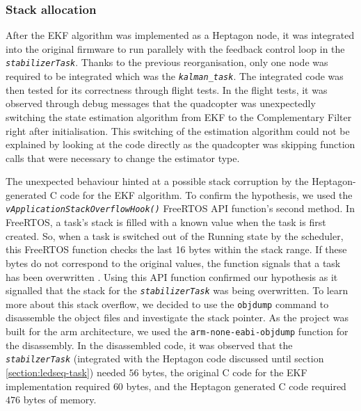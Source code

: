\documentclass[10pt, a4paper]{article}
\newcommand{\textFunc}[1]{\texttt{\textit{#1}}}
\newcommand{\code}[1]{\texttt{#1}}
\begin{document}
    \subsubsection{Stack allocation}
    After the EKF algorithm was implemented as a Heptagon node, it was integrated into the original firmware to run parallely with the feedback control loop in the \textFunc{stabilizerTask}. Thanks to the previous reorganisation, only one node was required to be integrated which was the \textFunc{kalman\_task}. The integrated code was then tested for its correctness through flight tests. In the flight tests, it was observed through debug messages that the quadcopter was unexpectedly switching the state estimation algorithm from EKF to the Complementary Filter right after initialisation. This switching of the estimation algorithm could not be explained by looking at the code directly as the quadcopter was skipping function calls that were necessary to change the estimator type.

    The unexpected behaviour hinted at a possible stack corruption by the Heptagon-generated C code for the EKF algorithm. To confirm the hypothesis, we used the \textFunc{vApplicationStackOverflowHook()} FreeRTOS API function's second method. In FreeRTOS, a task's stack is filled with a known value when the task is first created. So, when a task is switched out of the Running state by the scheduler, this FreeRTOS function checks the last 16 bytes within the stack range. If these bytes do not correspond to the original values, the function signals that a task has been overwritten \cite{web:freertos-stack-check}. Using this API function confirmed our hypothesis as it signalled that the stack for the \textFunc{stabilizerTask} was being overwritten. To learn more about this stack overflow, we decided to use the \code{objdump} command to disassemble the object files and investigate the stack pointer. As the project was built for the arm architecture, we used the \code{arm-none-eabi-objdump} function for the disassembly. In the disassembled code, it was observed that the \textFunc{stabilzerTask} (integrated with the Heptagon code discussed until section \ref{section:ledseq-task}) needed $56$ bytes, the original C code for the EKF implementation required $60$ bytes, and the Heptagon generated C code required $476$ bytes of memory. 
\end{document}
